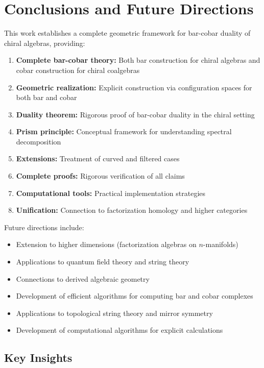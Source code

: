 \section{Conclusions and Future Directions}
 
This work establishes a complete geometric framework for bar-cobar duality of chiral algebras, providing:

\begin{enumerate}
\item \textbf{Complete bar-cobar theory:} Both bar construction for chiral algebras and cobar construction for chiral coalgebras
\item \textbf{Geometric realization:} Explicit construction via configuration spaces for both bar and cobar
\item \textbf{Duality theorem:} Rigorous proof of bar-cobar duality in the chiral setting
\item \textbf{Prism principle:} Conceptual framework for understanding spectral decomposition
\item \textbf{Extensions:} Treatment of curved and filtered cases
\item \textbf{Complete proofs:} Rigorous verification of all claims
\item \textbf{Computational tools:} Practical implementation strategies
\item \textbf{Unification:} Connection to factorization homology and higher categories
\end{enumerate}

Future directions include:
\begin{itemize}
\item Extension to higher dimensions (factorization algebras on $n$-manifolds)
\item Applications to quantum field theory and string theory
\item Connections to derived algebraic geometry
\item Development of efficient algorithms for computing bar and cobar complexes
\item Applications to topological string theory and mirror symmetry
\item Development of computational algorithms for explicit calculations
\end{itemize}
 
\subsection{Key Insights}
 
